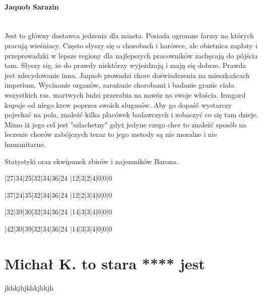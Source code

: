 \documentclass[a4paper,wide,11pt]{mwart}
\begin{document}
\paragraph{Jaquob Sarazin}\mbox{}\\\indent
Jest to główny dostawca jedzenia dla miasta. Posiada ogromne farmy na których pracują wieśniacy. Często słyszy się o chorobach i harówce, ale obietnica zapłaty i przeprowadzki w lepsze regiony dla najlepszych pracowników zachęcają do pójścia tam. Słyszy się, że do prawdy niektórzy wyjeżdzają i mają się dobrze. Prawda jest zdecydowanie inna. Jaquob prowadzi chore doświadczenia na mieszkańcach imperium. Wycinanie organów, zarażanie chorobami i badanie granic ciała wszystkich ras. martwych ludzi przerabia na nawóz na swoje włościa. Irmgard kupuje od niego krew poprzez swoich sługusów. Aby go dopaść wystarczy pojechać na pola, znaleźć kilka placówek badawczych i zobaczyć co się tam dzieje. Mimo iż jego cel jest "szlachetny" gdyż jedyne czego chce to znaleźć sposób na leczenie chorów zabójczych teraz to jego metody są nie moralne i nie humanitarne.


\pagebreak
\centering
{}
Statystyki oraz ekwipunek zbirów i najemników Barona.
\raggedright

\startwhtable[Zbir]
|27|34|25|32|34|36|24
|12|3|2|4|0|0|0
\stopwhtable

\startwhtable[Zbir 2]
|37|24|35|32|34|36|24
|12|2|3|4|0|0|0
\stopwhtable

\startwhtable[Zbir 3]
|32|39|30|32|34|36|24
|14|3|3|4|0|0|0
\stopwhtable

\startwhtable[Zbir 4]
|42|30|39|32|34|36|24
|14|3|3|4|0|0|0
\stopwhtable

\section{Michał K. to stara **** jest}
jkhkjhjkhkjhkjh
\end{document}
